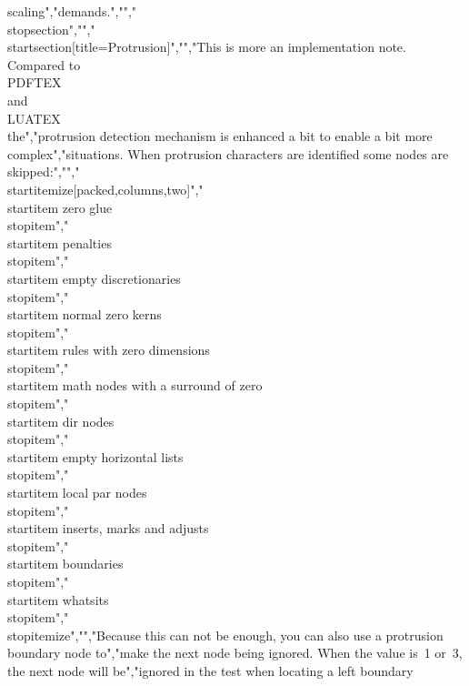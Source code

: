 scaling","demands.","","\\stopsection","","\\startsection[title=Protrusion]","","This is more an implementation note. Compared to \\PDFTEX\\ and \\LUATEX\\ the","protrusion detection mechanism is enhanced a bit to enable a bit more complex","situations. When protrusion characters are identified some nodes are skipped:","","\\startitemize[packed,columns,two]","\\startitem zero glue \\stopitem","\\startitem penalties \\stopitem","\\startitem empty discretionaries \\stopitem","\\startitem normal zero kerns \\stopitem","\\startitem rules with zero dimensions \\stopitem","\\startitem math nodes with a surround of zero \\stopitem","\\startitem dir nodes \\stopitem","\\startitem empty horizontal lists \\stopitem","\\startitem local par nodes \\stopitem","\\startitem inserts, marks and adjusts \\stopitem","\\startitem boundaries \\stopitem","\\startitem whatsits \\stopitem","\\stopitemize","","Because this can not be enough, you can also use a protrusion boundary node to","make the next node being ignored. When the value is~1 or~3, the next node will be","ignored in the test when locating a left boundary 